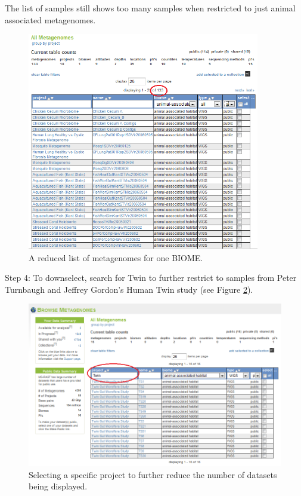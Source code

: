\documentclass[12pt,fullpage]{report}
\begin{document}
The list of samples still shows too many samples when restricted to just animal associated metagenomes.

\begin{figure}
\begin{center}
\includegraphics[width=4in]{Images/collections-filtered-but-too-many.png}
\end{center}
\caption{
A reduced list of metagenomes for one BIOME. }
\label{fig:collections-filtered-but-too-many}
\end{figure}

Step 4: To downselect, search for Twin to further restrict to samples from Peter Turnbaugh and Jeffrey Gordon’s Human Twin study (see Figure \ref{fig:collections-twin}).

\begin{figure}[ht]
\begin{center}
\includegraphics[width=6in]{Images/collections-twin.png}
\end{center}
\caption{
Selecting a specific project to further reduce the number of datasets being displayed. }
\label{fig:collections-twin}
\end{figure}
\end{document}

